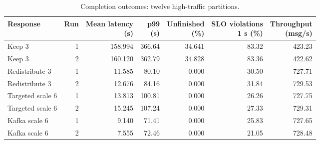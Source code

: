 \begin{table}[!htbp]
\centering\small
\setlength{\tabcolsep}{3pt}
\renewcommand{\arraystretch}{1.12}
\begin{tabular}{@{}lrrrrrr@{}}
\toprule
Response & Run & \shortstack{Mean latency\\(s)} & \shortstack{p99\\(s)} & \shortstack{Unfinished\\(\%)} & \shortstack{SLO violations\\1 s (\%)} & \shortstack{Throughput\\(msg/s)}\\
\midrule
Keep 3 & 1 & 158.994 & 366.64 & 34.641 & 83.32 & 423.23\\
Keep 3 & 2 & 160.120 & 362.79 & 34.828 & 83.36 & 422.62\\
Redistribute 3 & 1 & 11.585 & 80.10 & 0.000 & 30.50 & 727.71\\
Redistribute 3 & 2 & 12.676 & 84.16 & 0.000 & 31.84 & 729.53\\
Targeted scale 6 & 1 & 13.813 & 100.81 & 0.000 & 26.26 & 727.75\\
Targeted scale 6 & 2 & 15.245 & 107.24 & 0.000 & 27.33 & 729.31\\
Kafka scale 6 & 1 & 9.140 & 71.41 & 0.000 & 25.83 & 727.65\\
Kafka scale 6 & 2 & 7.555 & 72.46 & 0.000 & 21.05 & 728.48\\
\bottomrule
\end{tabular}
\caption{Completion outcomes: twelve high-traffic partitions.}
\label{tab:twelve-partition-outcomes}\label{tab:twelve-partition-latency-details}\label{tab:four-condition-outcomes}
\end{table}
